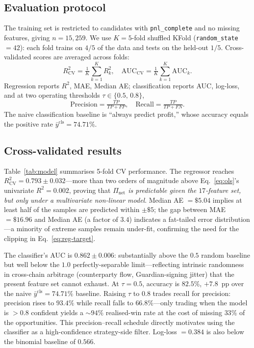 \documentclass[sigconf,nonacm,10pt]{acmart}
\newcommand{\Pnet}{\Pi_{\text{net}}}
\begin{document}
\subsection{Evaluation protocol}

The training set is restricted to candidates with
\texttt{pnl\_complete} and no missing features, giving $n=15{,}259$.
We use $K=5$-fold shuffled KFold (\texttt{random\_state}$=42$):
each fold trains on $4/5$ of the data and tests on the held-out
$1/5$. Cross-validated scores are averaged across folds:
\begin{equation}
R^2_{\text{CV}} = \tfrac{1}{K}\sum_{k=1}^{K} R^2_k,\quad
\text{AUC}_{\text{CV}} = \tfrac{1}{K}\sum_{k=1}^{K} \text{AUC}_k.
\label{eq:cv}
\end{equation}
Regression reports $R^2$, MAE, Median AE; classification reports
AUC, log-loss, and at two operating thresholds
$\tau\in\{0.5,\,0.8\}$,
\begin{equation}
\text{Precision}=\tfrac{TP}{TP+FP},\quad
\text{Recall}=\tfrac{TP}{TP+FN}.
\label{eq:pr}
\end{equation}
The naive classification baseline is ``always predict profit,''
whose accuracy equals the positive rate
$\bar y^{\text{cls}}=74.71\%$.

\subsection{Cross-validated results}

Table~\ref{tab:model} summarises 5-fold CV performance. The regressor
reaches $R^2_{\text{CV}}=0.793\pm 0.032$---more than two orders of
magnitude above Eq.~\eqref{eq:ols}'s univariate $R^2=0.002$, proving
that \emph{$\Pnet$ is predictable given the $17$-feature set, but
only under a multivariate non-linear model}. Median AE $=\$5.04$
implies at least half of the samples are predicted within $\pm\$5$;
the gap between MAE $=\$16.96$ and Median AE (a factor of $3.4$)
indicates a fat-tailed error distribution---a minority of extreme
samples remain under-fit, confirming the need for the clipping in
Eq.~\eqref{eq:reg-target}.

The classifier's AUC is $0.862\pm 0.006$: substantially above
the $0.5$ random baseline but well below the $1.0$ perfectly-separable
limit---reflecting intrinsic randomness in cross-chain arbitrage
(counterparty flow, Guardian-signing jitter) that the present feature
set cannot exhaust. At $\tau=0.5$, accuracy is $82.5\%$, $+7.8$~pp
over the naive $\bar y^{\text{cls}}=74.71\%$ baseline. Raising
$\tau$ to $0.8$ trades recall for precision: precision rises to
$93.4\%$ while recall falls to $66.8\%$---only trading when the
model is $>\!0.8$ confident yields a $\sim\!94\%$ realised-win rate
at the cost of missing $33\%$ of the opportunities. This
precision--recall schedule directly motivates using the classifier
as a high-confidence strategy-side filter. Log-loss $=0.384$ is also
below the binomial baseline of $0.566$.
\end{document}
